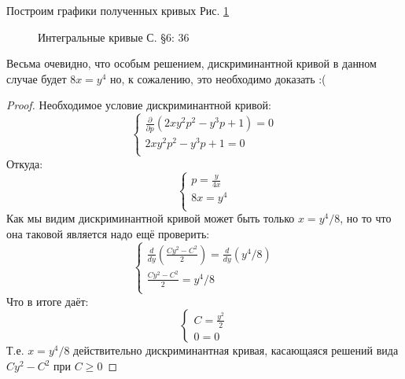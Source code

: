 \documentclass{article}
\begin{document}
Построим графики полученных кривых Рис. \ref{fig:6.36}
\begin{figure}[h]
\caption{Интегральные кривые С. \S6: 36}
\label{fig:6.36}
\end{figure}
\newline
Весьма очевидно, что особым решением, дискриминантной кривой в данном случае будет $8x=y^4$ но, к сожалению, это необходимо доказать :(
\begin{proof}
Необходимое условие дискриминантной кривой:
\begin{equation}
    \begin{cases}
    \frac{\partial}{\partial p}(2 x y^2 p^2 - y^3 p + 1) = 0\\
    2 x y^2 p^2 - y^3 p + 1 = 0\\
    \end{cases}
\end{equation}
Откуда:
\begin{equation}
    \begin{cases}
    p=\frac{y}{4 x}\\
    8x=y^4\\
    \end{cases}
\end{equation}
Как мы видим дискриминантной кривой может быть только $x=y^4/8$, но то что она таковой является надо ещё проверить:
\begin{equation}
    \begin{cases}
    \frac{d}{d y}(\frac{C y^2 - C^2}{2})=\frac{d}{d y}(y^4/8)\\
    \frac{C y^2 - C^2}{2}=y^4/8\\
    \end{cases}
\end{equation}
Что в итоге даёт:
\begin{equation}
    \begin{cases}
    C=\frac{y^2}{2}\\
    0=0
    \end{cases}
\end{equation}
Т.е. $x=y^4/8$ действительно дискриминантная кривая, касающаяся решений  вида $C y^2 - C^2$ при $C \geq 0$
\end{proof}
\end{document}
